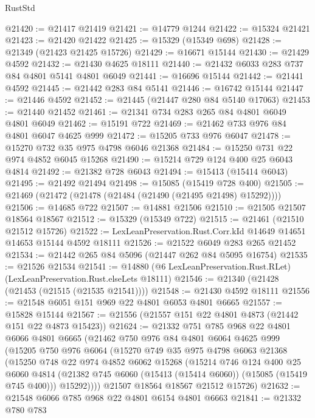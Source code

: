 \begin{lexlean}{RustStd}
\begin{coremodule}
@21420 := @21417 @21419
@21421 := @14779 @1244
@21422 := @15324 @21421
@21423 := @21420 @21422
@21425 := @15329 (@15349 @698)
@21428 := @21349 (@21423 @21425 @15726)
@21429 := @16671 @15144
@21430 := @21429 @4592
@21432 := @21430 @4625 @18111
@21440 := @21432 @6033 @283 @737 @84 @4801 @5141 @4801 @6049
@21441 := @16696 @15144
@21442 := @21441 @4592
@21445 := @21442 @283 @84 @5141
@21446 := @16742 @15144
@21447 := @21446 @4592
@21452 := @21445 (@21447 @280 @84 @5140 @17063)
@21453 := @21440 @21452
@21461 := @21341 @734 @283 @265 @84 @4801 @6049 @4801 @6049
@21462 := @15191 @722
@21469 := @21462 @733 @976 @84 @4801 @6047 @4625 @999
@21472 := @15205 @733 @976 @6047
@21478 := @15270 @732 @35 @975 @4798 @6046 @21368
@21484 := @15250 @731 @22 @974 @4852 @6045 @15268
@21490 := @15214 @729 @124 @400 @25 @6043 @4814
@21492 := @21382 @728 @6043
@21494 := @15413 (@15414 @6043)
@21495 := @21492 @21494
@21498 := @15085 (@15419 @728 @400)
@21505 := @21469 (@21472 (@21478 (@21484 (@21490 (@21495 @21498) @15292))))
@21506 := @14685 @722
@21507 := @14881 @21506
@21510 := @21505 @21507 @18564 @18567
@21512 := @15329 (@15349 @722)
@21515 := @21461 (@21510 @21512 @15726)
@21522 := LexLeanPreservation.Rust.Corr.kId @14649 @14651 @14653 @15144 @4592 @18111
@21526 := @21522 @6049 @283 @265 @21452
@21534 := @21442 @265 @84 @5096 (@21447 @262 @84 @5095 @16754)
@21535 := @21526 @21534
@21541 := @14880 (@6 LexLeanPreservation.Rust.RLet) (LexLeanPreservation.Rust.elseLets @18111)
@21546 := @21340 (@21428 (@21453 (@21515 (@21535 @21541))))
@21548 := @21430 @4592 @18111
@21556 := @21548 @6051 @151 @969 @22 @4801 @6053 @4801 @6665
@21557 := @15828 @15144
@21567 := @21556 (@21557 @151 @22 @4801 @4873 (@21442 @151 @22 @4873 @15423))
@21624 := @21332
    @751
    @785
    @968
    @22
    @4801
    @6066
    @4801
    @6665
    (@21462
      @750
      @976
      @84
      @4801
      @6064
      @4625
      @999
      (@15205
        @750
        @976
        @6064
        (@15270
          @749
          @35
          @975
          @4798
          @6063
          @21368
          (@15250
            @748
            @22
            @974
            @4852
            @6062
            @15268
            (@15214
              @746
              @124
              @400
              @25
              @6060
              @4814
              (@21382 @745 @6060 (@15413 (@15414 @6060)) (@15085 (@15419 @745 @400)))
              @15292))))
      @21507
      @18564
      @18567
      @21512
      @15726)
@21632 := @21548 @6066 @785 @968 @22 @4801 @6154 @4801 @6663
@21841 := @21332
    @780
    @783

\end{coremodule}
\end{lexlean}

